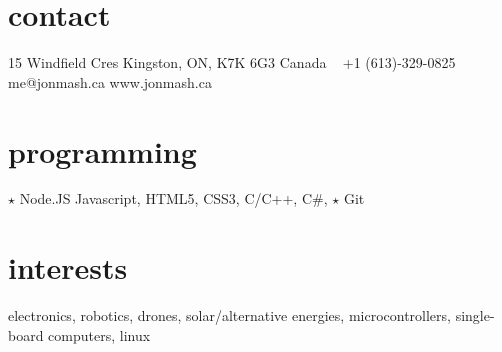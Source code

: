 
\begin{aside}
%
\section{contact}
15 Windfield Cres
Kingston, ON, K7K 6G3
Canada
~
+1 (613)-329-0825
~
me@jonmash.ca
www.jonmash.ca
%
\section{programming}
{\color{orange} $\star$} Node.JS
Javascript, HTML5, CSS3, C/C++, C\#, 
{\color{orange} $\star$} Git
%
\section{interests}
electronics, robotics, drones, solar/alternative energies, microcontrollers, single-board computers, linux
%
\end{aside}